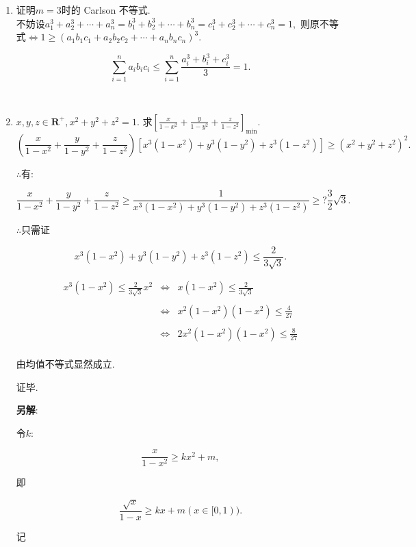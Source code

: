 \documentclass[8pt]{article}
\begin{document}
	\begin{enumerate}
		\item 证明$m=3$时的 Carlson 不等式.
			~\\

			不妨设$a_1^3+a_2^3+\cdots+a_n^3=b_1^3+b_2^3+\cdots+b_n^3=c_1^3+c_2^3+\cdots+c_n^3=1,$ 则原不等式$\Leftrightarrow 1\geq (a_1 b_1 c_1 + a_2 b_2 c_2 + \cdots + a_n b_n c_n )^3.$

			$$
			\sum_{i=1}^{n}{a_i b_i c_i} \leq \sum_{i=1}^{n} \frac{a_i^3 + b_i^3 + c_i^3}{3} = 1.
			$$

		~\\

		\item $x, y, z \in \mathbf{R}^{+}, x^2 + y^2 + z^2 = 1$. 求$\displaystyle \left[\frac{x}{1-x^2}+\frac{y}{1-y^2}+\frac{z}{1-z^2}\right]_{\min}$.
			~\\

			$$\left(\frac{x}{1-x^2}+\frac{y}{1-y^2}+\frac{z}{1-z^2}\right)\left[x^3(1-x^2)+y^3(1-y^2)+z^3(1-z^2)\right]\geq(x^2+y^2+z^2)^2.$$

			$\therefore$有:

			$$\frac{x}{1-x^2}+\frac{y}{1-y^2}+\frac{z}{1-z^2}\geq\frac{1}{x^3(1-x^2)+y^3(1-y^2)+z^3(1-z^2)} \geq ? \frac{3}{2} \sqrt{3}.$$

			$\therefore$只需证

			$$x^3(1-x^2)+y^3(1-y^2)+z^3(1-z^2) \leq \frac{2}{3\sqrt{3}}.$$

			$$
			\begin{array}{rcl}
			\displaystyle x^3(1-x^2)\leq \frac{2}{3\sqrt{3}}x^2&\Leftrightarrow&\displaystyle x(1-x^2)\leq\frac{2}{3\sqrt{3}}\\\\
			&\Leftrightarrow&\displaystyle x^2(1-x^2)(1-x^2)\leq\frac{4}{27}\\\\
			&\Leftrightarrow&\displaystyle 2x^2(1-x^2)(1-x^2)\leq\frac{8}{27}\\
			\end{array}
			$$

			由均值不等式显然成立.

			证毕.

			\textbf{另解}:

			令$k$:

			$$\frac{x}{1-x^2}\geq kx^2+m,$$

			即

			$$\frac{\sqrt{x}}{1-x}\geq kx+m (x\in[0, 1)).$$

			记


\end{enumerate}
\end{document}
